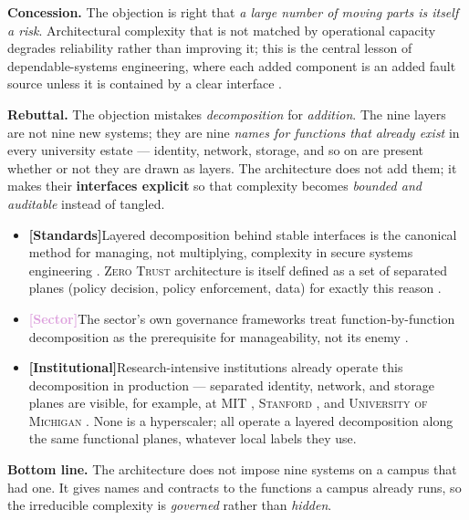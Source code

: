 \documentclass[11pt,a4paper,twoside]{book}
\let\citep\parencite
\newcommand{\keyword}[1]{\textbf{#1}}
\newcommand{\institution}[1]{\textsc{#1}}
\newcommand{\evstd}{\textcolor{NavyBlue}{\textbf{[Standards]}}\space}
\newcommand{\evsector}{\textcolor{Plum}{\textbf{[Sector]}}\space}
\newcommand{\evinst}{\textcolor{Slate}{\textbf{[Institutional]}}\space}
\begin{document}
\begin{answerbox}[Response O1.1]
\textbf{Concession.} The objection is right that \emph{a large number of
moving parts is itself a risk}. Architectural complexity that is not
matched by operational capacity degrades reliability rather than improving
it; this is the central lesson of dependable-systems engineering, where
each added component is an added fault source unless it is contained by a
clear interface \citep{avizienis2004}.

\medskip
\textbf{Rebuttal.} The objection mistakes \emph{decomposition} for
\emph{addition}. The nine layers are not nine new systems; they are nine
\emph{names for functions that already exist} in every university estate ---
identity, network, storage, and so on are present whether or not they are
drawn as layers. The architecture does not add them; it makes their
\keyword{interfaces explicit} so that complexity becomes \emph{bounded and
auditable} instead of tangled.

\begin{itemize}[leftmargin=1.4em,itemsep=2pt]
  \item \evstd Layered decomposition behind stable interfaces is the
        canonical method for managing, not multiplying, complexity in
        secure systems engineering \citep{nist-sp800-160v2,avizienis2004}.
        \institution{Zero Trust} architecture is itself defined as a set of
        separated planes (policy decision, policy enforcement, data) for
        exactly this reason \citep{nist-zt}.
  \item \evsector The sector's own governance frameworks treat
        function-by-function decomposition as the prerequisite for
        manageability, not its enemy \citep{cobit,dehaes2015}.
  \item \evinst Research-intensive institutions already operate this decomposition in
        production --- separated identity, network, and storage planes are
        visible, for example, at \institution{MIT} \citep{mit-ist,mit-kerberos},
        \institution{Stanford} \citep{stanford-uit,stanford-sunet}, and
        \institution{University of Michigan} \citep{umich-its,umich-core-network}.
        None is a hyperscaler; all operate a layered decomposition along the
        same functional planes, whatever local labels they use.
\end{itemize}

\textbf{Bottom line.} The architecture does not impose nine systems on a
campus that had one. It gives names and contracts to the functions a campus
already runs, so the irreducible complexity is \emph{governed} rather than
\emph{hidden}.
\end{answerbox}
\end{document}
